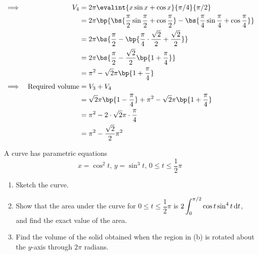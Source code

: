 \documentclass{echw}
\begin{document}
            \begin{alignat*}{2}
                \implies&& V_4 &= 2\pi \evalint{x\sin x + \cos x}{\pi/4}{\pi/2}\\
                && &= 2\pi \bp{\bs{\dfrac\pi2 \sin \dfrac\pi2 + \cos\dfrac\pi2} - \bs{\dfrac\pi4\sin\dfrac\pi4 + \cos\dfrac\pi4}}\\
                && &= 2\pi \bs{\dfrac\pi2 - \bp{\dfrac\pi4 \cdot \dfrac{\sqrt2}2 + \dfrac{\sqrt2}2}}\\
                && &= 2\pi \bs{\dfrac\pi2 - \dfrac{\sqrt2}2 \bp{1 + \dfrac\pi4}}\\
                && &= \pi^2 - \sqrt2 \pi \bp{1 + \dfrac\pi4}\\
                \implies&&\text{Required volume} &= V_3 + V_4\\
                && &= \sqrt2 \pi \bp{1 - \dfrac\pi4} + \pi^2 - \sqrt2 \pi \bp{1 + \dfrac\pi4}\\
                && &= \pi^2 - 2 \cdot \sqrt2 \pi \cdot \dfrac\pi4\\
                && &= \pi^2 - \dfrac{\sqrt2}2 \pi^2
            \end{alignat*}

    \problem{}
        A curve has parametric equations
        \[
            x = \cos^2 t, \, y = \sin^3 t, \, 0 \leq t \leq \dfrac12 \pi
        \]
        
        \begin{enumerate}
            \item Sketch the curve.
            \item Show that the area under the curve for $0 \leq t \leq \dfrac12 \pi$ is $2\displaystyle\int_0^{\pi/2} \cos t \sin^4 t \mathop{\mathrm{d}t}$, and find the exact value of the area.
            \item Find the volume of the solid obtained when the region in (b) is rotated about the $y$-axis through $2\pi$ radians.
        \end{enumerate}

    \solution
\end{document}
